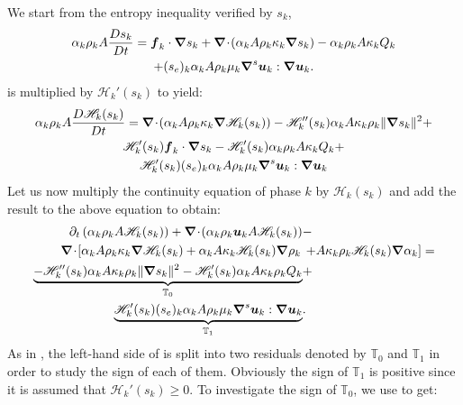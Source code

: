 \begin{appendices}
We start from the entropy inequality verified by $s_k$, 
%
\begin{multline}\label{eq:ent-res-7-eqn-diss-terms-app}
\alpha_k \rho_k A \frac{Ds_k}{Dt} =  \boldsymbol f_k \cdot \boldsymbol\nabla s_k + \boldsymbol\nabla\! \cdot \! \left( \alpha_k A \rho_k \kappa_k  \boldsymbol\nabla s_k \right)  
- \alpha_k \rho_k A \kappa_k Q_k \\ + (s_e)_k \alpha_k A \rho_k \mu_k \boldsymbol\nabla^s \boldsymbol u_k : \boldsymbol\nabla \boldsymbol u_k.
\end{multline}
%
 is multiplied by $\mathscr{H}_k'(s_k)$ to yield:
%
\begin{multline}
\label{eq:ent-res-7-eqn-diss-terms-app2}
\alpha_k \rho_k A \frac{D\mathscr{H}_k(s_k)}{Dt} = \boldsymbol\nabla\! \cdot \! \left( \alpha_k A \rho_k \kappa_k \boldsymbol\nabla \mathscr{H}_k (s_k) \right) - \mathscr{H}_k''(s_k) \alpha_k A \kappa_k \rho_k \| \boldsymbol\nabla s_k \|^2 + \\
\mathscr{H}_k'(s_k) \boldsymbol f_k \cdot \boldsymbol\nabla s_k - \mathscr{H}_k'(s_k)\alpha_k \rho_k A \kappa_k Q_k +  \\
\mathscr{H}_k'(s_k)(s_e)_k \alpha_k A \rho_k \mu_k \boldsymbol\nabla^s \boldsymbol u_k : \boldsymbol\nabla \boldsymbol u_k 
\end{multline}
%
Let us now multiply the continuity equation of phase $k$ by $\mathscr{H}_k (s_k)$ and add the result to the above equation to obtain:
%
\begin{align}\label{eq:ent-res-7-eqn-diss-terms-app3}
\partial_t \left( \alpha_k \rho_k A \mathscr{H}_k(s_k)\right) + \boldsymbol\nabla\! \cdot \! \left( \alpha_k \rho_k \boldsymbol u_k A \mathscr{H}_k(s_k) \right)  &- \nonumber\\
\boldsymbol\nabla\! \cdot \! \left[ \alpha_k A \rho_k \kappa_k \boldsymbol\nabla \mathscr{H}_k (s_k) + \alpha_k A \kappa_k \mathscr{H}_k (s_k) \boldsymbol\nabla \rho_k  \right. & \left. + A \kappa_k \rho_k \mathscr{H}_k (s_k) \boldsymbol\nabla \alpha_k\right] = \nonumber \\
\underbrace{-\mathscr{H}_k''(s_k) \alpha_k A \kappa_k \rho_k \| \boldsymbol\nabla s_k \|^2  - \mathscr{H}_k'(s_k) \alpha_k A \kappa_k \rho_k  Q_k}_{\mathbb{T}_0} &+\nonumber \\
\underbrace{ \mathscr{H}_k'(s_k)(s_e)_k  \alpha_k A \rho_k \mu_k \boldsymbol\nabla^s \boldsymbol u_k : \boldsymbol\nabla \boldsymbol u_k}_{\mathbb{T}_1} & .
\end{align}
%
As in , the left-hand side of  is split into two residuals denoted by $\mathbb{T}_0$ and $\mathbb{T}_1$ in order to study the sign of each of them.
Obviously the sign of $\mathbb{T}_1$ is positive since it is assumed that $ \mathscr{H}_k'(s_k) \geq 0$.  To investigate the sign of $\mathbb{T}_0$, we use  to get:

\end{appendices}
